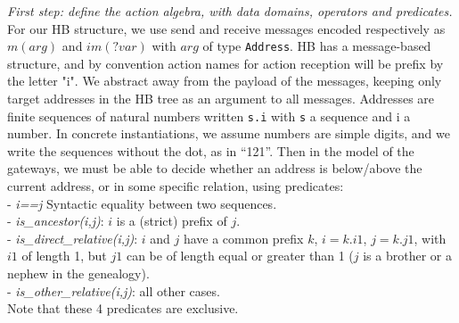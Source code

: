 \documentclass{lncs/llncs}
\begin{document}
\begin{example} \emph{First step: define the action algebra, with data domains,
    operators and predicates.}
  For our HB structure, we use send and receive messages encoded
  respectively as $m(arg)$ and $im(?var)$ with
  $arg$ of type \texttt{Address}. HB has a message-based
  structure, and by convention action names for action reception will
  be prefix by the letter "i". We abstract away
  from the payload of the messages, keeping only target addresses in the HB
  tree as an argument to all messages. Addresses are finite sequences
  of natural numbers written \texttt{s.i}
  with \texttt{s} a sequence and i a number. In concrete instantiations, we
  assume numbers are simple digits, and we write the sequences without
  the dot, as in ``121''. Then in the model of the
  gateways, we must be able to decide whether an address is below/above the
  current address, or in some specific relation, using
  predicates:\\
  - \emph{i==j} Syntactic equality between two sequences.\\
  - \emph{is\_ancestor(i,j)}: $i$ is a (strict) prefix of $j$.\\
  - \emph{is\_direct\_relative(i,j)}: $i$ and $j$ have a common prefix $k$, $i=k.i1$, $j=k.j1$, with $i1$ of length 1, but $j1$ can be of length equal or greater than 1 ($j$ is a brother or a nephew in the genealogy).\\
  - \emph{is\_other\_relative(i,j)}: all other cases.\\
  Note that these 4 predicates are exclusive.
\end{example}
\end{document}
